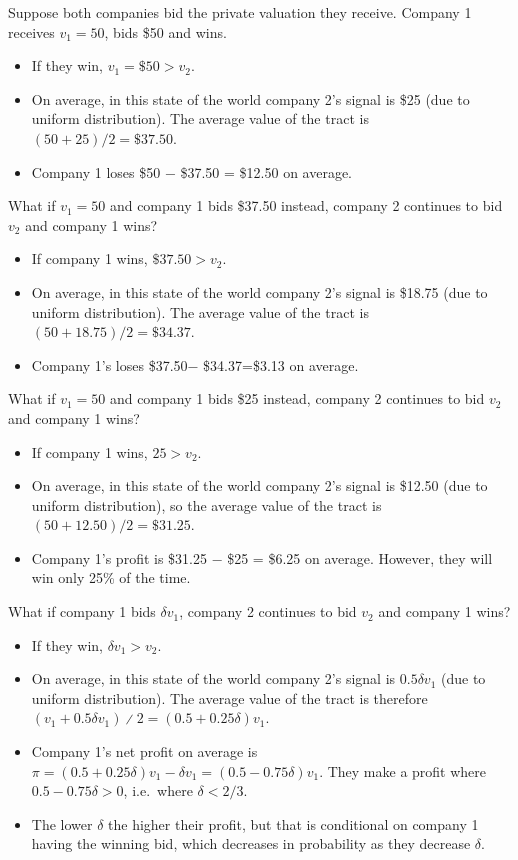 \documentclass[
  letterpaper,
  DIV=11,
  numbers=noendperiod]{scrreprt}
\begin{document}
Suppose both companies bid the private valuation they receive. Company 1
receives \(v_1=50\), bids \$50 and wins.

\begin{itemize}
\item
  If they win, \(v_1=\$50>v_2\).
\item
  On average, in this state of the world company 2's signal is \$25 (due
  to uniform distribution). The average value of the tract is
  \((50+25)/2=\$37.50\).
\item
  Company 1 loses \$50 − \$37.50 = \$12.50 on average.
\end{itemize}

What if \(v_1=50\) and company 1 bids \$37.50 instead, company 2
continues to bid \(v_2\) and company 1 wins?

\begin{itemize}
\item
  If company 1 wins, \(\$37.50>v_2\).
\item
  On average, in this state of the world company 2's signal is \$18.75
  (due to uniform distribution). The average value of the tract is
  \((50 + 18.75)/2=\$34.37\).
\item
  Company 1's loses \$37.50− \$34.37=\$3.13 on average.
\end{itemize}

What if \(v_1=50\) and company 1 bids \$25 instead, company 2 continues
to bid \(v_2\) and company 1 wins?

\begin{itemize}
\item
  If company 1 wins, \(25>v_2\).
\item
  On average, in this state of the world company 2's signal is \$12.50
  (due to uniform distribution), so the average value of the tract is
  \((50 +12.50)/2=\$31.25\).
\item
  Company 1's profit is \$31.25 − \$25 = \$6.25 on average. However,
  they will win only 25\% of the time.
\end{itemize}

What if company 1 bids \(\delta v_1\), company 2 continues to bid
\(v_2\) and company 1 wins?

\begin{itemize}
\item
  If they win, \(\delta v_1>v_2\).
\item
  On average, in this state of the world company 2's signal is
  \(0.5\delta v_1\) (due to uniform distribution). The average value of
  the tract is therefore \((v_1+0.5\delta v_1 )∕2=(0.5+0.25\delta)v_1\).
\item
  Company 1's net profit on average is
  \(\pi=(0.5+0.25\delta)v_1−\delta v_1=(0.5−0.75\delta)v_1\). They make
  a profit where \(0.5−0.75\delta>0\), i.e.~where \(\delta<2/3\).
\item
  The lower \(\delta\) the higher their profit, but that is conditional
  on company 1 having the winning bid, which decreases in probability as
  they decrease \(\delta\).
\end{itemize}
\end{document}
